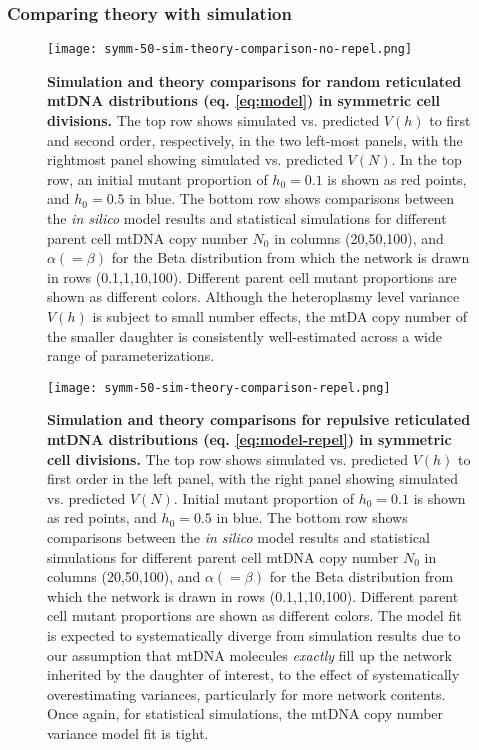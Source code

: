 \documentclass{article}
\begin{document}
\begin{appendices}
\subsubsection{Comparing theory with simulation}
\begin{figure}[!ht]
        \centering \texttt{[image: symm-50-sim-theory-comparison-no-repel.png]}
        \caption{\textbf{Simulation and theory comparisons for random reticulated mtDNA distributions (eq. \ref{eq:model}) in symmetric cell divisions.} The top row shows simulated vs. predicted $V(h)$ to first and second order, respectively, in the two left-most panels, with the rightmost panel showing simulated vs. predicted $V(N)$. In the top row, an initial mutant proportion of $h_0=0.1$ is shown as red points, and $h_0=0.5$ in blue. The bottom row shows comparisons between the \textit{in silico} model results and statistical simulations for different parent cell mtDNA copy number $N_0$ in columns (20,50,100), and $\alpha(=\beta)$ for the Beta distribution from which the network is drawn in rows (0.1,1,10,100). Different parent cell mutant proportions are shown as different colors. Although the heteroplasmy level variance $V(h)$ is subject to small number effects, the mtDA copy number of the smaller daughter is consistently well-estimated across a wide range of parameterizations.}
\end{figure}\label{fig:app-sim-theory}
\begin{figure}[!ht]
        \centering \texttt{[image: symm-50-sim-theory-comparison-repel.png]}
        \caption{\textbf{Simulation and theory comparisons for repulsive reticulated mtDNA distributions (eq. \ref{eq:model-repel}) in symmetric cell divisions.} The top row shows simulated vs. predicted $V(h)$ to first order in the left panel, with the right panel showing simulated vs. predicted $V(N)$. Initial mutant proportion of $h_0=0.1$ is shown as red points, and $h_0=0.5$ in blue. The bottom row shows comparisons between the \textit{in silico} model results and statistical simulations for different parent cell mtDNA copy number $N_0$ in columns (20,50,100), and $\alpha(=\beta)$ for the Beta distribution from which the network is drawn in rows (0.1,1,10,100). Different parent cell mutant proportions are shown as different colors. The model fit is expected to systematically diverge from simulation results due to our assumption that mtDNA molecules \textit{exactly} fill up the network inherited by the daughter of interest, to the effect of systematically overestimating variances, particularly for more network contents. Once again, for statistical simulations, the mtDNA copy number variance model fit is tight.}\label{fig:app-sim-theory-repel}

\end{figure}
\end{appendices}
\end{document}
